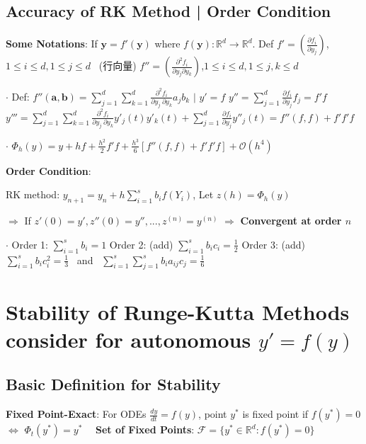 \documentclass[9pt]{article}
\begin{document}
\subsection{Accuracy of RK Method | Order Condition} %

\textbf{Some Notations}: If $\mathbf{y}=f'(\mathbf{y})$ where $f(\mathbf{y}):\mathbb{R}^d\to\mathbb{R}^d$. \quad Def $f'=(\frac{\partial f_i}{\partial y_j})$,{\scriptsize $1\leq i\leq d,1\leq j\leq d$} \ {\tiny (行向量)} \qquad $f''=(\frac{\partial^2 f_i}{\partial y_j\partial y_k})$,{\scriptsize $1\leq i\leq d,1\leq j,k\leq d$} 

$\cdot$ Def: {\footnotesize $f''(\mathbf{a},\mathbf{b})=\sum_{j=1}^{d}\sum_{k=1}^{d}\frac{\partial^2 f_i}{\partial y_{j} \ \partial y_{k}}a_jb_k$ \quad $\big|$ $y'=f$ \quad $y''=\sum_{j=1}^{d}\frac{\partial f_i}{\partial y_j}f_j=f'f$ \quad $y'''=\sum_{j=1}^{d}\sum_{k=1}^{d}\frac{\partial^2f_i}{\partial y_j \ \partial y_k}y'_j(t)y'_k(t)+\sum_{j=1}^{d}\frac{\partial f_i}{\partial y_j}y''_j(t)=f''(f,f)+f'f'f$}

$\cdot$ $\Phi_h(y)=y+hf+\frac{h^2}{2}f'f+\frac{h^3}{6}[f''(f,f)+f'f'f]+\mathcal{O}(h^4)$

\textbf{Order Condition}: {\small RK method: $y_{n+1}=y_n+h\sum_{i=1}^{s}b_if(Y_i)$, Let $z(h)=\Phi_h(y)$ 

\hspace{110pt} $\Rightarrow$ If $z'(0)=y',z''(0)=y'',...,z^{(n)}=y^{(n)}$ $\Rightarrow$ { \textbf{Convergent at order $n$}}}

$\cdot$ Order 1: $\sum_{i=1}^{s}b_i=1$ \qquad Order 2: { (add)} $\sum_{i=1}^{s}b_ic_i=\frac{1}{2}$ \qquad Order 3: { (add)} $\sum_{i=1}^{s}b_ic_i^2=\frac{1}{3}$ \ and \ $\sum_{i=1}^{s}\sum_{j=1}^{s}b_ia_{ij}c_j=\frac{1}{6}$


\section{Stability of Runge-Kutta Methods {\scriptsize consider for autonomous $y'=f(y)$}} %

\subsection{Basic Definition for Stability} %

\textbf{Fixed Point-Exact}: For ODEs $\frac{dy}{dt}=f(y)$, point $y^*$ is fixed point if $f(y^*)=0$ $\Leftrightarrow$ $\Phi_t(y^*)=y^*$ {\footnotesize \ \ \textbf{Set of Fixed Points}: $\mathcal{F}=\{y^*\in\mathbb{R}^d:f(y^*)=0\}$}
\end{document}
